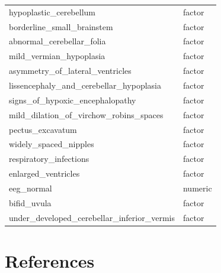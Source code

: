 \documentclass[
  letterpaper,
  DIV=11,
  numbers=noendperiod]{scrartcl}
\begin{document}
\begin{longtable}{ll}
hypoplastic\_cerebellum & factor \\ 
borderline\_small\_brainstem & factor \\ 
abnormal\_cerebellar\_folia & factor \\ 
mild\_vermian\_hypoplasia & factor \\ 
asymmetry\_of\_lateral\_ventricles & factor \\ 
lissencephaly\_and\_cerebellar\_hypoplasia & factor \\ 
signs\_of\_hypoxic\_encephalopathy & factor \\ 
mild\_dilation\_of\_virchow\_robins\_spaces & factor \\ 
pectus\_excavatum & factor \\ 
widely\_spaced\_nipples & factor \\ 
respiratory\_infections & factor \\ 
enlarged\_ventricles & factor \\ 
eeg\_normal & numeric \\ 
bifid\_uvula & factor \\ 
under\_developed\_cerebellar\_inferior\_vermis & factor \\ 
\bottomrule
\end{longtable}

\newpage

\hypertarget{references}{%
\section*{References}\label{references}}
\end{document}
